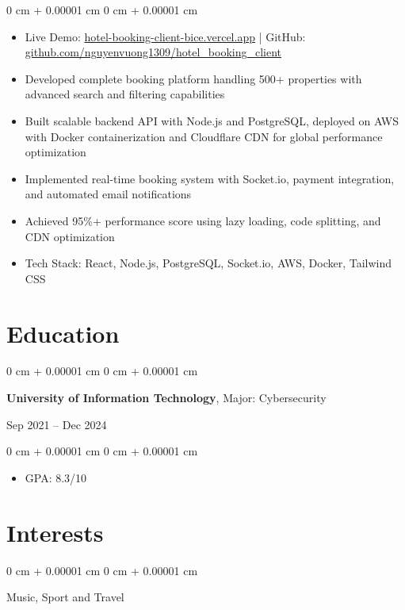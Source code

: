 \documentclass[10pt, letterpaper]{article}
\newenvironment{highlights}{
    \begin{itemize}[
        topsep=0.10 cm,
        parsep=0.10 cm,
        partopsep=0pt,
        itemsep=0pt,
        leftmargin=0 cm + 10pt
    ]
}{
    \end{itemize}
} %
\newenvironment{onecolentry}{
    \begin{adjustwidth}{
        0 cm + 0.00001 cm
    }{
        0 cm + 0.00001 cm
    }
}{
    \end{adjustwidth}
} %
\newenvironment{twocolentry}[2][]{
    \onecolentry
    \def\secondColumn{#2}
    \setcolumnwidth{\fill, 4.5 cm}
    \begin{paracol}{2}
}{
    \switchcolumn \raggedleft \secondColumn
    \end{paracol}
    \endonecolentry
} %
\begin{document}
        \vspace{0.15 cm}
        \begin{onecolentry}
            \begin{highlights}
                \item Live Demo: \href{https://hotel-booking-client-bice.vercel.app}{hotel-booking-client-bice.vercel.app} | GitHub: \href{https://github.com/nguyenvuong1309/hotel_booking_client}{github.com/nguyenvuong1309/hotel\_booking\_client}
                \item Developed complete booking platform handling 500+ properties with advanced search and filtering capabilities
                \item Built scalable backend API with Node.js and PostgreSQL, deployed on AWS with Docker containerization and Cloudflare CDN for global performance optimization
                \item Implemented real-time booking system with Socket.io, payment integration, and automated email notifications
                \item Achieved 95\%+ performance score using lazy loading, code splitting, and CDN optimization
                \item Tech Stack: React, Node.js, PostgreSQL, Socket.io, AWS, Docker, Tailwind CSS
            \end{highlights}
        \end{onecolentry}

    \section{Education}

        \begin{twocolentry}{
            Sep 2021 – Dec 2024
        }
            \textbf{University of Information Technology}, Major: Cybersecurity
        \end{twocolentry}

        \vspace{0.15 cm}
        \begin{onecolentry}
            \begin{highlights}
                \item GPA: 8.3/10
            \end{highlights}
        \end{onecolentry}

    \section{Interests}

        \begin{onecolentry}
            Music, Sport and Travel
        \end{onecolentry}
\end{document}
